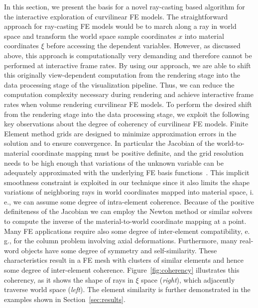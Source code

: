 \documentclass[review,journal]{vgtc}         %
\begin{document}
In this section, we present the basis for a novel ray-casting based algorithm for the interactive exploration of curvilinear FE models. The straightforward approach for ray-casting FE models would be to march along a ray in world space and transform the world space sample coordinates $x$ into material coordinates $\xi$ before accessing the dependent variables. However, as discussed above, this approach is computationally very demanding and therefore cannot be performed at interactive frame rates. By using our approach, we are able to shift this originally view-dependent computation from the rendering stage into the data processing stage of the visualization pipeline. Thus, we can reduce the computation complexity necessary during rendering and achieve interactive frame rates when volume rendering curvilinear FE models. To perform the desired shift from the rendering stage into the data processing stage, we exploit the following key observations about the degree of coherency of curvilinear FE models. Finite Element method grids are designed to minimize approximation errors in the solution and to ensure convergence. In particular the Jacobian of the world-to-material coordinate mapping must be positive definite, and the grid resolution needs to be high enough that variations of the unknown variable can be adequately approximated with the underlying FE basis functions~\cite{knupp07meshquality}. This implicit smoothness constraint is exploited in our technique since it also limits the shape variations of neighboring rays in world coordinates mapped into material space, i.\,e., we can assume some degree of intra-element coherence. Because of the positive definiteness of the Jacobian we can employ the Newton method or similar solvers to compute the inverse of the material-to-world coordinate mapping at a point. Many FE applications require also some degree of inter-element compatibility, e.\,g., for the column problem involving axial deformations. Furthermore, many real-word objects have some degree of symmetry and self-similarity. These characteristics result in a FE mesh with clusters of similar elements and hence some degree of inter-element coherence. Figure~\ref{fig:coherency} illustrates this coherency, as it shows the shape of rays in $\xi$ space ({\it right}), which adjacently traverse world space ({\it left}). The element similarity is further demonstrated in the examples shown in Section~\ref{sec:results}.
\end{document}
